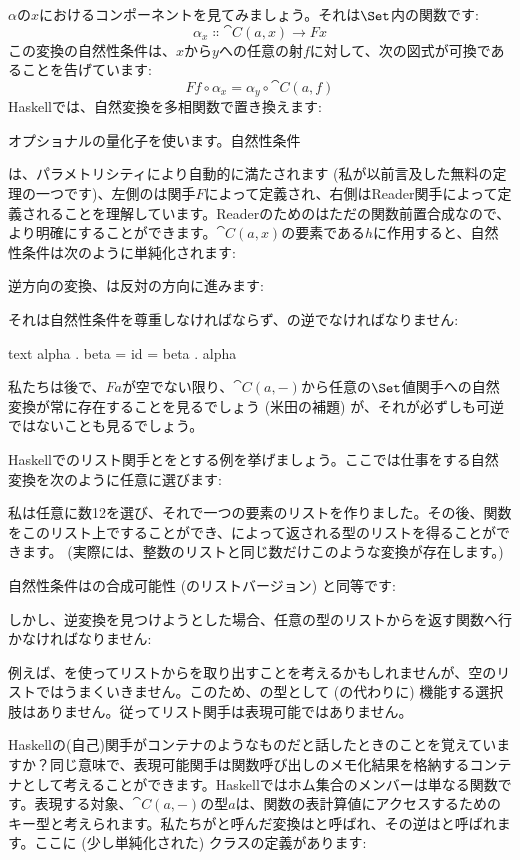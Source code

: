 $\alpha$の$x$におけるコンポーネントを見てみましょう。それは$\Set$内の関数です: 
\[\alpha_x \Colon \cat{C}(a, x) \to F x\]
この変換の自然性条件は、$x$から$y$への任意の射$f$に対して、次の図式が可換であることを告げています: 
\[F f \circ \alpha_x = \alpha_y \circ \cat{C}(a, f)\]
Haskellでは、自然変換を多相関数で置き換えます: 

オプショナルの量化子を使います。自然性条件

は、パラメトリシティにより自動的に満たされます (私が以前言及した無料の定理の一つです)、左側のは関手$F$によって定義され、右側はReader関手によって定義されることを理解しています。Readerのためのはただの関数前置合成なので、より明確にすることができます。$\cat{C}(a, x)$の要素である$h$に作用すると、自然性条件は次のように単純化されます: 

逆方向の変換、は反対の方向に進みます: 

それは自然性条件を尊重しなければならず、の逆でなければなりません: 

\begin{snip}{text}
alpha . beta = id = beta . alpha
\end{snip}
私たちは後で、$F a$が空でない限り、$\cat{C}(a, -)$から任意の$\Set$値関手への自然変換が常に存在することを見るでしょう (米田の補題) が、それが必ずしも可逆ではないことも見るでしょう。

Haskellでのリスト関手とをとする例を挙げましょう。ここでは仕事をする自然変換を次のように任意に選びます: 

私は任意に数12を選び、それで一つの要素のリストを作りました。その後、関数をこのリスト上ですることができ、によって返される型のリストを得ることができます。 (実際には、整数のリストと同じ数だけこのような変換が存在します。) 

自然性条件はの合成可能性 (のリストバージョン) と同等です: 

しかし、逆変換を見つけようとした場合、任意の型のリストからを返す関数へ行かなければなりません: 

例えば、を使ってリストからを取り出すことを考えるかもしれませんが、空のリストではうまくいきません。このため、の型として (の代わりに) 機能する選択肢はありません。従ってリスト関手は表現可能ではありません。

Haskellの(自己)関手がコンテナのようなものだと話したときのことを覚えていますか？同じ意味で、表現可能関手は関数呼び出しのメモ化結果を格納するコンテナとして考えることができます。Haskellではホム集合のメンバーは単なる関数です。表現する対象、$\cat{C}(a, -)$の型$a$は、関数の表計算値にアクセスするためのキー型と考えられます。私たちがと呼んだ変換はと呼ばれ、その逆はと呼ばれます。ここに (少し単純化された) クラスの定義があります: 


